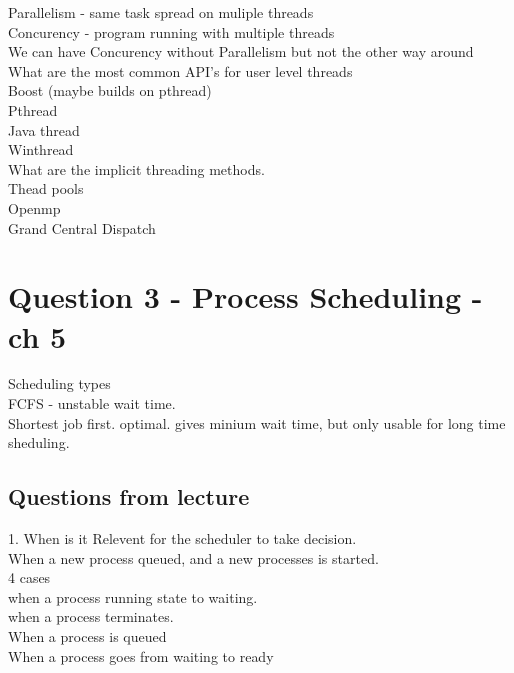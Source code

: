\documentclass[a4paper,10pt,titlepage]{report}
\begin{document}
\hspace{10mm}	Parallelism - same task spread on muliple threads\\
\hspace{10mm}	Concurency - program running with multiple threads\\
\hspace{10mm}  	We can have Concurency without Parallelism but not the other way around\\
\vspace{5mm}
What are the most common API's for user level threads\\
\hspace{10mm} Boost (maybe builds on pthread) \\
\hspace{10mm} Pthread \\
\hspace{10mm} Java thread \\
\hspace{10mm} Winthread \\
\vspace{5mm}
What are the implicit threading methods.\\
\hspace{10mm} Thead pools \\
\hspace{10mm} Openmp \\
\hspace{10mm} Grand Central Dispatch \\

\newpage

\section{Question 3 - Process Scheduling - ch 5}
Scheduling types\\
FCFS - unstable wait time.\\
Shortest job first. optimal. gives minium wait time, but only usable for long time sheduling.\\

\subsection{Questions from lecture}
1. When is it Relevent for the scheduler to take  decision.\\
\hspace{10mm}When a new process queued, and a new processes is started.\\
\hspace{10mm}4 cases\\
\hspace{20mm}when a process running state to waiting.\\
\hspace{20mm}when a process terminates.\\
\hspace{20mm}When a process is queued\\
\hspace{20mm}When a process goes from waiting to ready\\
\end{document}
